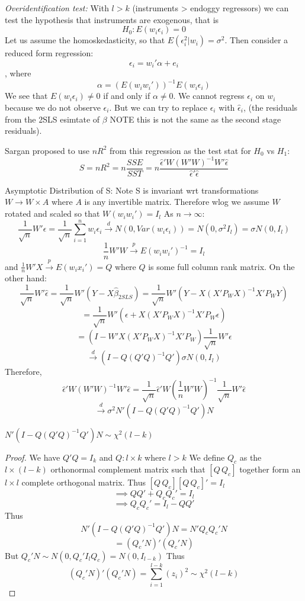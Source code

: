 \documentclass[DIV=14,titlepage=false]{scrreprt}
\begin{document}
\textit{Overidentification test:}
With \(l>k\) (instruments > endoggy regressors) we can test the hypothesis that instruments are exogenous, that is
\[H_0: E(w_i\epsilon_i)=0\]
Let us assume the homoskedasticity, so that \(E(\epsilon_i^2|w_i)=\sigma^2\). Then consider a reduced form regression:
\[\epsilon_i=w_i'\alpha+e_i\],
where
\[\alpha=(E(w_iw_i'))^{-1}E(w_i\epsilon_i)\]
We see that \(E(w_i\epsilon_i)\neq0\) if and only if \(\alpha\neq0\).
We cannot regress \(\epsilon_i\) on \(w_i\) because we do not observe \(\epsilon_i\). But we can try to replace \(\epsilon_i\) with \(\hat \epsilon_i\),
(the residuals from the 2SLS esimtate of \(\beta\) NOTE this is not the same as the second stage residuals).

Sargan proposed to use \(nR^2\) from this regression as the test stat for \(H_0\) vs \(H_1\):
\[S=nR^2=n\frac{SSE}{SST}=n\frac{\hat\epsilon'W(W'W)^{-1}W'\hat\epsilon}{\hat\epsilon'\hat\epsilon}\]

Asymptotic Distribution of S:
Note S is invariant wrt transformations \(W \rightarrow W\times A\) where \(A\) is any invertible matrix. Therefore wlog we assume \(W\) rotated and scaled so that \(W(w_iw_i')=I_l\) As \(n\rightarrow\infty\):
\[\frac{1}{\sqrt{n}}W'\epsilon=\frac{1}{\sqrt{n}}\sum_{i=1}^n w_i\epsilon_i\xrightarrow{d}N(0,Var(w_i\epsilon_i))=N(0,\sigma^2I_l)=\sigma N(0,I_l)\]
\[\frac{1}{n}W'W\xrightarrow{p}E(w_iw_i')^{-1}=I_l\]
and \(\frac{1}{n}W'X\xrightarrow{p}E(w_ix_i')=Q\) where \(Q\) is some full column rank matrix. On the other hand:
\[\frac{1}{\sqrt{n}}W'\hat\epsilon=\frac{1}{\sqrt{n}}W'(Y-X\hat\beta_{2SLS})=\frac{1}{\sqrt{n}}W'(Y-X(X'P_WX)^{-1}X'P_WY)\]
\[=\frac{1}{\sqrt{n}}W'(\epsilon + X(X'P_WX)^{-1}X'P_W\epsilon)\]
\[=(I-W'X(X'P_WX)^{-1}X'P_W)\frac{1}{\sqrt{n}}W'\epsilon\]
\[\xrightarrow{d} (I-Q(Q'Q)^{-1}Q')\sigma N(0,I_l)\]
Therefore,
\[\hat\epsilon'W(W'W)^{-1}W'\hat\epsilon=\frac{1}{\sqrt{n}}\hat\epsilon'W(\frac{1}{n}W'W)^{-1}\frac{1}{\sqrt{n}}W'\hat\epsilon\]
\[\xrightarrow{d} \sigma^2N'(I-Q(Q'Q)^{-1}Q') N\]

\begin{lemma}
    \(N'(I-Q(Q'Q)^{-1}Q') N\sim\chi^2(l-k)\)
\end{lemma}
\vspace{5mm}
\begin{proof}
We have \(Q'Q=I_k\) and \(Q: l\times k\) where \(l>k\)
We define \(Q_c\) as the \(l\times (l-k)\) orthonormal complement matrix such that \([Q \, Q_c]\) together form an \(l\times l\) complete orthogonal matrix.
Thus \([Q \, Q_c][Q \, Q_c]'=I_l\)
\[\implies QQ' + Q_cQ_c'=I_l\]
\[\implies Q_cQ_c'=I_l-QQ'\]
Thus \[N'(I-Q(Q'Q)^{-1}Q') N= N'Q_cQ_c'N\]
\[=(Q_c'N)'(Q_c'N)\]
But \(Q_c'N \sim N(0,Q_c'I_lQ_c)=N(0,I_{l-k})\)
Thus \[(Q_c'N)'(Q_c'N)=\sum_{i=1}^{l-k}(z_i)^2\sim\chi^2(l-k)\]
\end{proof}
\end{document}
